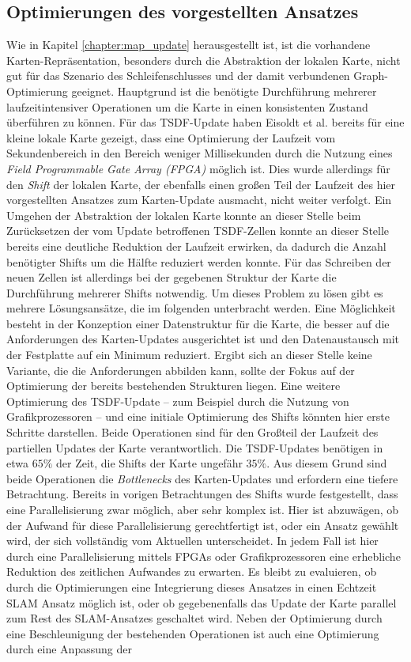 \subsection{Optimierungen des vorgestellten Ansatzes}

Wie in Kapitel \ref{chapter:map_update} herausgestellt ist, ist die vorhandene Karten-Repräsentation, besonders durch die Abstraktion der lokalen Karte, nicht gut für das Szenario des Schleifenschlusses und der damit verbundenen Graph-Optimierung geeignet. Hauptgrund ist die benötigte Durchführung mehrerer laufzeitintensiver Operationen um die Karte in einen konsistenten Zustand überführen zu können. Für das TSDF-Update haben Eisoldt et al. \cite{HATSDF} bereits für eine kleine lokale Karte gezeigt, dass eine Optimierung der Laufzeit vom Sekundenbereich in den Bereich weniger Millisekunden durch die Nutzung eines \emph{Field Programmable Gate Array (FPGA)} möglich ist. Dies wurde allerdings für den \emph{Shift} der lokalen Karte, der ebenfalls einen großen Teil der Laufzeit des hier vorgestellten Ansatzes zum Karten-Update ausmacht, nicht weiter verfolgt. Ein Umgehen der Abstraktion der lokalen Karte konnte an dieser Stelle beim Zurücksetzen der vom Update betroffenen TSDF-Zellen konnte an dieser Stelle bereits eine deutliche Reduktion der Laufzeit erwirken, da dadurch die Anzahl benötigter Shifts um die Hälfte reduziert werden konnte. Für das Schreiben der neuen Zellen ist allerdings bei der gegebenen Struktur der Karte die Durchführung mehrerer Shifts notwendig. Um dieses Problem zu lösen gibt es mehrere Lösungsansätze, die im folgenden unterbracht werden. Eine Möglichkeit besteht in der Konzeption einer Datenstruktur für die Karte, die besser auf die Anforderungen des Karten-Updates ausgerichtet ist und den Datenaustausch mit der Festplatte auf ein Minimum reduziert. Ergibt sich an dieser Stelle keine Variante, die die Anforderungen abbilden kann, sollte der Fokus auf der Optimierung der bereits bestehenden Strukturen liegen. Eine weitere Optimierung des TSDF-Update -- zum Beispiel durch die Nutzung von Grafikprozessoren -- und eine initiale Optimierung des Shifts könnten hier erste Schritte darstellen. Beide Operationen sind für den Großteil der Laufzeit des partiellen Updates der Karte verantwortlich. Die TSDF-Updates benötigen in etwa $65\%$ der Zeit, die Shifts der Karte ungefähr $35\%$. Aus diesem Grund sind beide Operationen die \emph{Bottlenecks} des Karten-Updates und erfordern eine tiefere Betrachtung. Bereits in vorigen Betrachtungen des Shifts wurde festgestellt, dass eine Parallelisierung zwar möglich, aber sehr komplex ist. Hier ist abzuwägen, ob der Aufwand für diese Parallelisierung gerechtfertigt ist, oder ein Ansatz gewählt wird, der sich vollständig vom Aktuellen unterscheidet. In jedem Fall ist hier durch eine Parallelisierung mittels FPGAs oder Grafikprozessoren eine erhebliche Reduktion des zeitlichen Aufwandes zu erwarten. Es bleibt zu evaluieren, ob durch die Optimierungen eine Integrierung dieses Ansatzes in einen Echtzeit SLAM Ansatz möglich ist, oder ob gegebenenfalls das Update der Karte parallel zum Rest des SLAM-Ansatzes geschaltet wird. Neben der Optimierung durch eine Beschleunigung der bestehenden Operationen ist auch eine Optimierung durch eine Anpassung der 